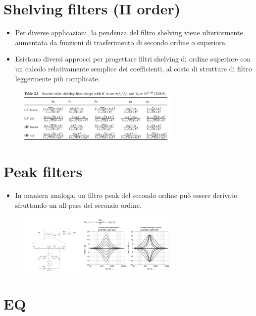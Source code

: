 \section{Shelving filters (II order)}

\begin{itemize}
    \item Per diverse applicazioni, la pendenza del filtro shelving viene ulteriormente aumentata da funzioni di trasferimento di secondo ordine o superiore.
    
    \item Esistono diversi approcci per progettare filtri shelving di ordine superiore con un calcolo relativamente semplice dei coefficienti, al costo di strutture di filtro leggermente più complicate.
\end{itemize}
\begin{figure}[H]
    \centering
    \includegraphics[width=0.7\textwidth]{capitoli/capitolo15/immagini/image11.png}
\end{figure}

\section{Peak filters}

\begin{itemize}
    \item In maniera analoga, un filtro peak del secondo ordine può essere derivato sfruttando un all-pass del secondo ordine.
\end{itemize}
\begin{figure}[H]
    \centering
    \includegraphics[width=0.7\textwidth]{capitoli/capitolo15/immagini/image12.png}
\end{figure}
\vspace{8cm}
\section{EQ}

